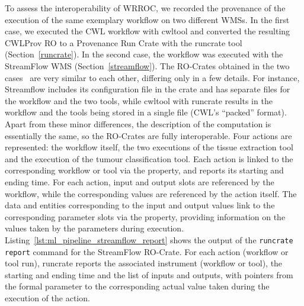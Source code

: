 \documentclass[10pt,letterpaper]{article}
\newcommand{\termsorg}[1]{\href{https://schema.org/#1}{\color{black}{\emph{s:#1}}}}
\begin{document}
To assess the interoperability of WRROC, we recorded the provenance of the execution of the same exemplary workflow on two different WMSs.
In the first case, we executed the CWL workflow with cwltool and converted the resulting CWLProv RO to a Provenance Run Crate with the runcrate tool (Section~\ref{runcrate}).
In the second case, the workflow was executed with the StreamFlow WMS (Section~\ref{streamflow}).
%
The RO-Crates obtained in the two cases~\cite{run-pathology, Colonnelli 2023}
are very similar to each other, differing only in a few details. For instance, Streamflow includes its configuration file in the crate and has separate files for the workflow and the two tools, while
cwltool with runcrate results in the workflow and the tools being stored in a single file (CWL's ``packed'' format).
Apart from these minor differences, the description of the computation is essentially the same, so the RO-Crates are fully interoperable.
%
Four actions are represented: the workflow itself, the two executions of the tissue extraction tool and the execution of the tumour classification tool.
Each action is linked to the corresponding workflow or tool via the
\termsorg{instrument} property, and reports its starting and ending time. For each action, input and output slots are referenced by the workflow, while the corresponding values are referenced by the action itself.
The data and \termsorg{PropertyValue} entities corresponding to the input and output values link to the corresponding parameter slots via the \termsorg{exampleOfWork} property, providing information on the values taken by the parameters during execution.
Listing~\ref{lst:ml_pipeline_streamflow_report} shows the output of the
\texttt{runcrate report} command for the StreamFlow RO-Crate. 
For each action (workflow or tool run), runcrate reports the associated instrument (workflow or tool), the starting and ending time and the list of inputs and outputs, with pointers from the formal parameter to the corresponding actual value taken during the execution of the action.
\end{document}
